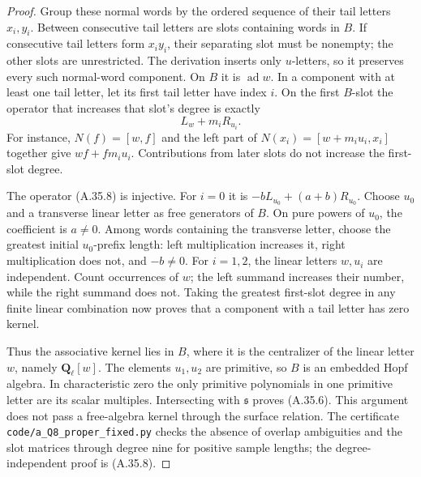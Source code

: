 \begin{proof}
Group these normal words by the ordered sequence of their
tail letters \(x_i,y_i\). Between consecutive tail letters
are slots containing words in \(B\). If consecutive tail
letters form \(x_i y_i\), their separating slot must be
nonempty; the other slots are unrestricted. The derivation
inserts only \(u\)-letters, so it preserves every such
normal-word component. On \(B\) it is \(\operatorname{ad}w\).
In a component with at least one tail letter, let its first
tail letter have index \(i\). On the first \(B\)-slot the
operator that increases that slot's degree is exactly
\[
                      L_w+m_iR_{u_i}.
                                                        \tag{A.35.8}
\]
For instance, \(N(f)=[w,f]\) and the left part of
\(N(x_i)=[w+m_i u_i,x_i]\) together give
\(wf+fm_i u_i\). Contributions from later slots do not
increase the first-slot degree.

The operator (A.35.8) is injective. For \(i=0\) it is
\(-bL_{u_0}+(a+b)R_{u_0}\). Choose \(u_0\) and a transverse
linear letter as free generators of \(B\). On pure powers
of \(u_0\), the coefficient is \(a\ne0\). Among words
containing the transverse letter, choose the greatest
initial \(u_0\)-prefix length: left multiplication increases
it, right multiplication does not, and \(-b\ne0\).
For \(i=1,2\), the linear letters \(w,u_i\) are independent.
Count occurrences of \(w\); the left summand increases
their number, while the right summand does not.
Taking the greatest first-slot degree in any finite
linear combination now proves that a component with a
tail letter has zero kernel.

Thus the associative kernel lies in \(B\), where it is
the centralizer of the linear letter \(w\), namely
\(\mathbf Q_\ell[w]\). The elements \(u_1,u_2\) are
primitive, so \(B\) is an embedded Hopf algebra. In
characteristic zero the only primitive polynomials in
one primitive letter are its scalar multiples. Intersecting
with \(\mathfrak s\) proves (A.35.6). This argument does not
pass a free-algebra kernel through the surface relation.
The certificate \texttt{code/a\_Q8\_proper\_fixed.py}
checks the absence of overlap ambiguities and the slot
matrices through degree nine for positive sample lengths;
the degree-independent proof is (A.35.8).


\end{proof}
